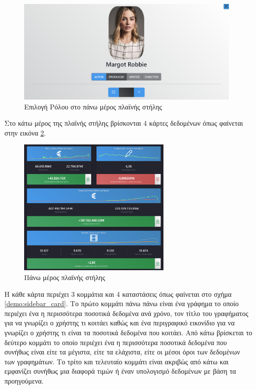 \begin{figure}[h]
  \centering
  \includegraphics[width=110mm]{Chapters/6 - Manual/Images/main_page_sidebar_top_person.png}
  \caption{Επιλογή Ρόλου στο πάνω μέρος πλαϊνής στήλης}
  \label{demo:sidebar_top_person}
\end{figure}

Στο κάτω μέρος της πλαϊνής στήλης βρίσκονται 4 κάρτες δεδομένων όπως φαίνεται στην εικόνα \ref{demo:sidebar_bottom}.

\begin{figure}[h]
  \centering
  \includegraphics[width=75mm]{Chapters/6 - Manual/Images/main_page_sidebar_bottom.png}
  \caption{Πάνω μέρος πλαϊνής στήλης}
  \label{demo:sidebar_bottom}
\end{figure}

Η κάθε κάρτα περιέχει 3 κομμάτια και 4 καταστάσεις όπως φαίνεται στο σχήμα \ref{demo:sidebar_card}. Το πρώτο κομμάτι πάνω πάνω είναι ένα γράφημα το οποίο περιέχει ένα η περισσότερα ποσοτικά δεδομένα ανά χρόνο, τον τίτλο του γραφήματος για να γνωρίζει ο χρήστης τι κοιτάει καθώς και ένα περιγραφικό εικονίδιο για να γνωρίζει ο χρήστης τι είναι τα ποσοτικά δεδομένα που κοιτάει. Από κάτω βρίσκεται το δεύτερο κομμάτι το οποίο περιέχει ένα η περισσότερα ποσοτικά δεδομένα που συνήθως είναι είτε τα μέγιστα, είτε τα ελάχιστα, είτε οι μέσοι όροι των δεδομένων των γραφημάτων. Το τρίτο και τελευταίο κομμάτι είναι ακριβώς από κάτω και εμφανίζει συνήθως μια διαφορά τιμών ή έναν υπολογισμό δεδομένων με βάση τα προηγούμενα. 

